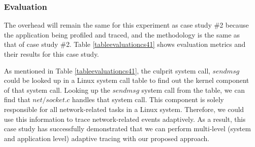 \documentclass[pdflatex,sn-nature]{sn-jnl}%
\theoremstyle{thmstyleone}%
\theoremstyle{thmstyletwo}%
\theoremstyle{thmstylethree}%
\begin{document}
\subsubsection{Evaluation}
The overhead will remain the same for this experiment as case study \#2 because the application being profiled and traced, and the methodology is the same as that of case study \#2. Table \ref{tableevaluationcs41} shows evaluation metrics and their results for this case study.


\begin{table}[tbp]

\centering
{}
\caption{Evaluation | Issue: Slow Startup Of Firefox If Network Connectivity Issue Exists| Case Study: 4}
\label{tableevaluationcs41}
\end{table}

As mentioned in Table \ref{tableevaluationcs41}, the culprit system call, $sendmsg$ could be looked up in a Linux system call table \cite{valsorda-no-date} to find out the kernel component of that system call. Looking up the $sendmsg$ system call from the table, we can find that $net/socket.c$ handles that system call. This component is solely responsible for all network-related tasks in a Linux system. Therefore, we could use this information to trace network-related events adaptively. As a result, this case study has successfully demonstrated that we can perform multi-level (system and application level) adaptive tracing with our proposed approach.
\end{document}
